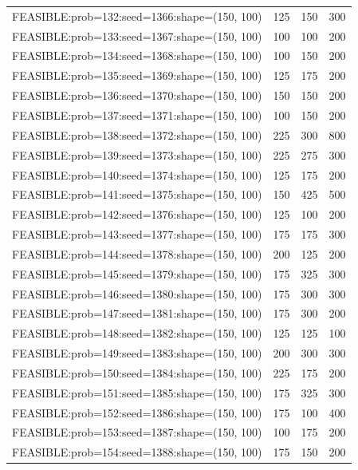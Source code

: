 \begin{longtable}{lccc}
FEASIBLE:prob=132:seed=1366:shape=(150, 100) &      125 &   150 &    300 \\
FEASIBLE:prob=133:seed=1367:shape=(150, 100) &      100 &   100 &    200 \\
FEASIBLE:prob=134:seed=1368:shape=(150, 100) &      100 &   150 &    200 \\
FEASIBLE:prob=135:seed=1369:shape=(150, 100) &      125 &   175 &    200 \\
FEASIBLE:prob=136:seed=1370:shape=(150, 100) &      150 &   150 &    200 \\
FEASIBLE:prob=137:seed=1371:shape=(150, 100) &      100 &   150 &    200 \\
FEASIBLE:prob=138:seed=1372:shape=(150, 100) &      225 &   300 &    800 \\
FEASIBLE:prob=139:seed=1373:shape=(150, 100) &      225 &   275 &    300 \\
FEASIBLE:prob=140:seed=1374:shape=(150, 100) &      125 &   175 &    200 \\
FEASIBLE:prob=141:seed=1375:shape=(150, 100) &      150 &   425 &    500 \\
FEASIBLE:prob=142:seed=1376:shape=(150, 100) &      125 &   100 &    200 \\
FEASIBLE:prob=143:seed=1377:shape=(150, 100) &      175 &   175 &    300 \\
FEASIBLE:prob=144:seed=1378:shape=(150, 100) &      200 &   125 &    200 \\
FEASIBLE:prob=145:seed=1379:shape=(150, 100) &      175 &   325 &    300 \\
FEASIBLE:prob=146:seed=1380:shape=(150, 100) &      175 &   300 &    300 \\
FEASIBLE:prob=147:seed=1381:shape=(150, 100) &      175 &   300 &    200 \\
FEASIBLE:prob=148:seed=1382:shape=(150, 100) &      125 &   125 &    100 \\
FEASIBLE:prob=149:seed=1383:shape=(150, 100) &      200 &   300 &    300 \\
FEASIBLE:prob=150:seed=1384:shape=(150, 100) &      225 &   175 &    200 \\
FEASIBLE:prob=151:seed=1385:shape=(150, 100) &      175 &   325 &    300 \\
FEASIBLE:prob=152:seed=1386:shape=(150, 100) &      175 &   100 &    400 \\
FEASIBLE:prob=153:seed=1387:shape=(150, 100) &      100 &   175 &    200 \\
FEASIBLE:prob=154:seed=1388:shape=(150, 100) &      175 &   150 &    200 \\

\end{longtable}
